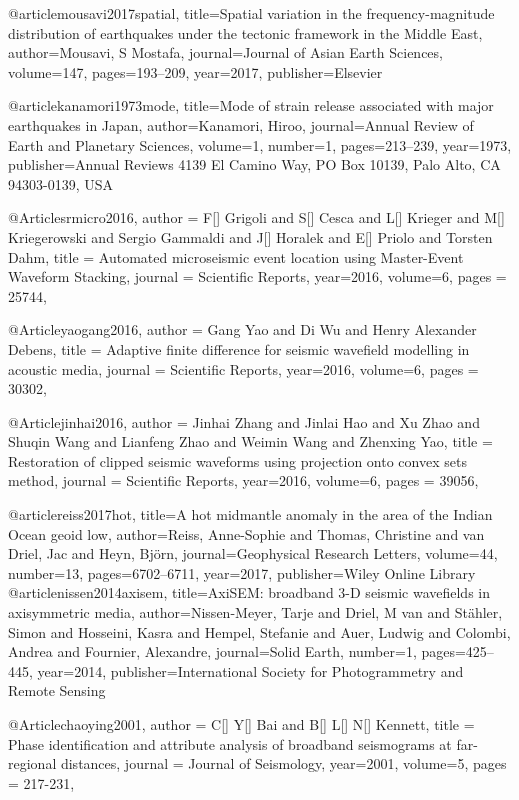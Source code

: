 @article{mousavi2017spatial,
  title={Spatial variation in the frequency-magnitude distribution of earthquakes under the tectonic framework in the Middle East},
  author={Mousavi, S Mostafa},
  journal={Journal of Asian Earth Sciences},
  volume={147},
  pages={193--209},
  year={2017},
  publisher={Elsevier}
}

@article{kanamori1973mode,
  title={Mode of strain release associated with major earthquakes in Japan},
  author={Kanamori, Hiroo},
  journal={Annual Review of Earth and Planetary Sciences},
  volume={1},
  number={1},
  pages={213--239},
  year={1973},
  publisher={Annual Reviews 4139 El Camino Way, PO Box 10139, Palo Alto, CA 94303-0139, USA}
}

@Article{srmicro2016,
  author =	 {F[] Grigoli and S[] Cesca and L[] Krieger and M[] Kriegerowski and Sergio Gammaldi and J[] Horalek and E[] Priolo and Torsten Dahm},
  title =	 {Automated microseismic event location using Master-Event Waveform Stacking},
  journal =	 {Scientific Reports},
  year=2016,
  volume=6,
  pages =	 {25744},
}

@Article{yaogang2016,
  author =	 {Gang Yao and Di Wu and Henry Alexander Debens},
  title =	 {Adaptive finite difference for seismic wavefield modelling in acoustic media},
  journal =	 {Scientific Reports},
  year=2016,
  volume=6,
  pages =	 {30302},
}

@Article{jinhai2016,
  author =	 {Jinhai Zhang and Jinlai Hao and Xu Zhao and Shuqin Wang and Lianfeng Zhao and Weimin Wang and Zhenxing Yao},
  title =	 {Restoration of clipped seismic waveforms using projection onto convex sets method},
  journal =	 {Scientific Reports},
  year=2016,
  volume=6,
  pages =	 {39056},
}

@article{reiss2017hot,
  title={A hot midmantle anomaly in the area of the Indian Ocean geoid low},
  author={Reiss, Anne-Sophie and Thomas, Christine and van Driel, Jac and Heyn, Bj{\"o}rn},
  journal={Geophysical Research Letters},
  volume={44},
  number={13},
  pages={6702--6711},
  year={2017},
  publisher={Wiley Online Library}
}
@article{nissen2014axisem,
  title={AxiSEM: broadband 3-D seismic wavefields in axisymmetric media},
  author={Nissen-Meyer, Tarje and Driel, M van and St{\"a}hler, Simon and Hosseini, Kasra and Hempel, Stefanie and Auer, Ludwig and Colombi, Andrea and Fournier, Alexandre},
  journal={Solid Earth},
  number={1},
  pages={425--445},
  year={2014},
  publisher={International Society for Photogrammetry and Remote Sensing}
}

@Article{chaoying2001,
  author =	 {C[] Y[] Bai and B[] L[] N[] Kennett},
  title =	 {Phase identification and attribute analysis of broadband seismograms at far-regional distances},
  journal =	 {Journal of Seismology},
  year=2001,
  volume=5,
  pages =	 {217-231},
}


